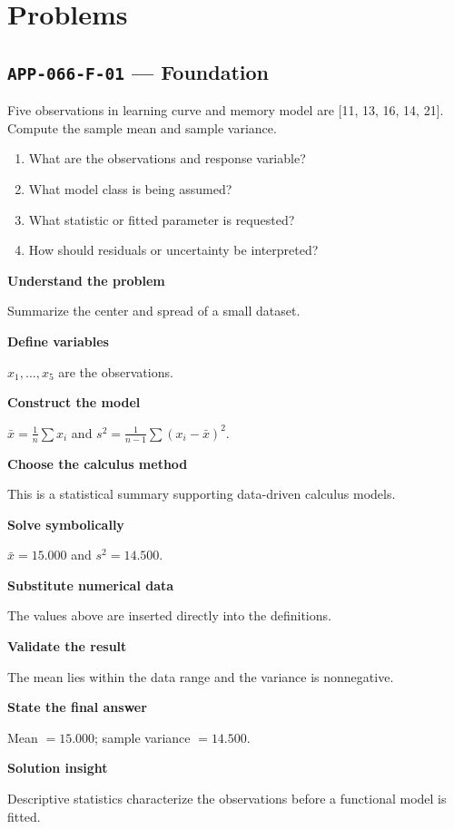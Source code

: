 \documentclass[11pt]{book}
\newcommand{\pid}[1]{\texttt{#1}}
\begin{document}
\section*{Problems}
\subsection*{\pid{APP-066-F-01} — Foundation}
\begin{problembox}
Five observations in learning curve and memory model are [11, 13, 16, 14, 21]. Compute the sample mean and sample variance.
\end{problembox}
\begin{promptbox}\begin{enumerate}
\item What are the observations and response variable?
\item What model class is being assumed?
\item What statistic or fitted parameter is requested?
\item How should residuals or uncertainty be interpreted?
\end{enumerate}\end{promptbox}
\begin{solutionbox}
\textbf{Understand the problem}\par Summarize the center and spread of a small dataset.\par\medskip
\textbf{Define variables}\par $x_1,\dots,x_5$ are the observations.\par\medskip
\textbf{Construct the model}\par $\bar x=\frac1n\sum x_i$ and $s^2=\frac1{n-1}\sum(x_i-\bar x)^2$.\par\medskip
\textbf{Choose the calculus method}\par This is a statistical summary supporting data-driven calculus models.\par\medskip
\textbf{Solve symbolically}\par $\bar x=15.000$ and $s^2=14.500$.\par\medskip
\textbf{Substitute numerical data}\par The values above are inserted directly into the definitions.\par\medskip
\textbf{Validate the result}\par The mean lies within the data range and the variance is nonnegative.\par\medskip
\textbf{State the final answer}\par Mean $=15.000$; sample variance $=14.500$.\par\medskip
\textbf{Solution insight}\par Descriptive statistics characterize the observations before a functional model is fitted.\par\medskip
\end{solutionbox}
\end{document}
